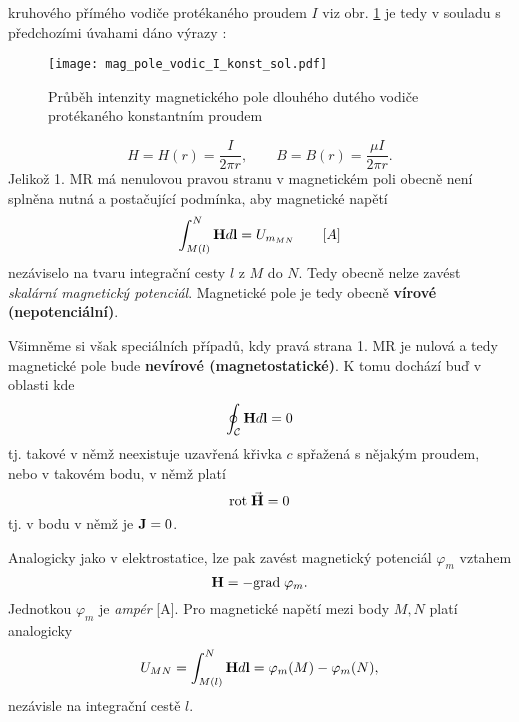     kruhové\-ho přímého vodiče protékaného proudem $I$ viz obr.
    \ref{TEMP:fig_mag_pole_vodic_I_konst_sol} je tedy v souladu s předchozími úvahami dáno výrazy   
    \cite[s.~183 - 185]{Kotlan1999}:
    \begin{figure}[ht!]
      \centering
      \texttt{[image: mag\_pole\_vodic\_I\_konst\_sol.pdf]}
      \caption[Průběh intenzity magnetického pole dlouhého dutého vodiče protékaného konstantním
               proudem]{Průběh intenzity magnetického pole dlouhého dutého vodiče protékaného
               konstantním proudem}
      \label{TEMP:fig_mag_pole_vodic_I_konst_sol}
    \end{figure}      
      \begin{equation}\label{TEMP:eq_Hr_Br_vodice}
        H = H(r) = \frac{I}{2\pi r}, \qquad B = B(r) = \frac{\mu I}{2\pi r}.
      \end{equation}   
    Jelikož 1. MR má nenulovou pravou stranu v magnetickém poli obecně není splněna nutná a
    postačující podmínka, aby magnetické napětí
      \begin{equation}\label{TEMP:eq_mag_napeti}
        \int_{M(l)}^N\mathbf{H}d\mathbf{l} = U_{m_{MN}} \qquad [A]
      \end{equation}       
    nezáviselo na tvaru integrační cesty $l$ z $M$ do $N$. Tedy obecně nelze zavést \emph{skalární
    magnetický potenciál}. Magnetické pole je tedy obecně \textbf{vírové (nepotenciální)}.

    Všimněme si však speciálních případů, kdy pravá strana 1. MR je nulová a tedy magnetické pole
    bude \textbf{nevírové (magnetostatické)}. K tomu dochází buď v oblasti kde 
      \begin{equation}\label{TEMP:eq_1MR_0}
        \oint_{\mathcal{C}}\mathbf{H}d\mathbf{l} = 0
      \end{equation}    
    tj. takové v němž neexistuje uzavřená křivka $c$ spřažená s nějakým proudem, nebo v takovém
    bodu, v němž platí
      \begin{equation}\label{TEMP:eq_rotH_0}
        \mathrm{rot}\;\vec{\mathbf{H}} = 0
      \end{equation}
    tj. v bodu v němž je $\mathbf{J} = 0$.
    
    Analogicky jako v elektrostatice, lze pak zavést magnetický potenciál $\varphi_m$ vztahem  
      \begin{equation}\label{TEMP:eq_grad_varphi_m}
        \mathbf{H} = - \mathrm{grad\;}\varphi_m.
      \end{equation}              
    Jednotkou $\varphi_m$ je \emph{ampér} [A]. Pro magnetické napětí mezi body $M, N$ platí
    analogicky
      \begin{equation}\label{TEMP:eq_Umn_def}
        U_{MN} = \int_{M(l)}^N\mathbf{H}d\mathbf{l} = \varphi_m(M) - \varphi_m(N),
      \end{equation}        
    nezávisle na integrační cestě $l$. 
     
